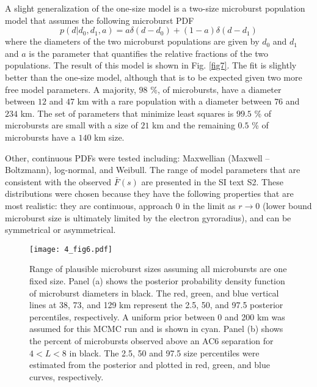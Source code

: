 A slight generalization of the one-size model is a two-size microburst population model that assumes the following microburst PDF
\begin{equation}
p(d | d_0, d_1, a) = a \delta(d-d_0) + (1-a)\delta(d-d_1)
\end{equation} where the diameters of the two microburst populations are given by $d_0$ and $d_1$ and $a$ is the parameter that quantifies the relative fractions of the two populations. The result of this model is shown in Fig. \ref{fig7}. The fit is slightly better than the one-size model, although that is to be expected given two more free model parameters. A majority, $98$ \%, of microbursts, have a diameter between $12$ and $47$ km with a rare population with a diameter between $76$ and $234$ km. The set of parameters that minimize least squares is $99.5$ \% of microbursts are small with a size of $21$ km and the remaining $0.5$ \% of microbursts have a $140$ km size.

Other, continuous PDFs were tested including: Maxwellian (Maxwell -- Boltzmann), log-normal, and Weibull. The range of model parameters that are consistent with the observed $\bar{F}(s)$ are presented in the SI text S2. These distributions were chosen because they have the following properties that are most realistic: they are continuous, approach 0 in the limit as $r \rightarrow 0$ (lower bound microburst size is ultimately limited by the electron gyroradius), and can be symmetrical or asymmetrical.

\begin{figure}
\texttt{[image: 4\_fig6.pdf]}
\caption{Range of plausible microburst sizes assuming all microbursts are one fixed size. Panel (a) shows the posterior probability density function of microburst diameters in black. The red, green, and blue vertical lines at 38, 73, and 129 km represent the 2.5, 50, and 97.5 posterior percentiles, respectively. A uniform prior between 0 and 200 km was assumed for this MCMC run and is shown in cyan. Panel (b) shows the percent of microbursts observed above an AC6 separation for $4 < L < 8$ in black. The 2.5, 50 and 97.5 size percentiles were estimated from the posterior and plotted in red, green, and blue curves, respectively.} 
\label{fig6}
\end{figure}

